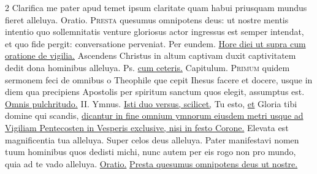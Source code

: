 \begin{multicols*}{2}
 Clarifica me pater apud temet ipsum claritate quam habui priusquam mundus fieret alleluya. {\color{Red} Oratio.}
\lettrine[lines=2]{\zallmancaps \color{Blue} P}{resta} \hypertarget{presta-quesumus-ascensionis}{\label{presta-quesumus-ascensionis}} quesumus omnipotens deus: ut nostre mentis intentio quo sollemnitatis venture gloriosus actor ingressus est semper intendat, et quo fide pergit: conversatione perveniat. Per eundem. \ul{Hore diei ut supra cum oratione de vigilia.}
 Ascendens Christus in altum captivam duxit captivitatem dedit dona hominibus alleluya. {\color{Red} Ps.}  \ul{cum ceteris.} {\color{Red} Capitulum.}
\lettrine[lines=2]{\zallmancaps \color{Red} P}{rimum} \hypertarget{primum-quidem-capitulum}{\label{primum-quidem-capitulum}} quidem sermonem feci de omnibus o Theophile que cepit Ihesus facere et docere, usque in diem qua precipiens Apostolis per spiritum sanctum quos elegit, assumptus est. \R \hyperlink{omnis-pulchritudo}{Omnis pulchritudo.} {\color{Red} II. Ymnus.}
\newline \ul{Isti duo versus, scilicet,} Tu esto, \ul{et} Gloria tibi domine qui scandis, \ul{dicantur in fine omnium ymnorum eiusdem metri usque ad Vigiliam Pentecosten in Vesperis exclusive, nisi in festo Corone.}
\newline \V Elevata est magnificentia tua alleluya. \V Super celos deus alleluya.
 Pater manifestavi nomen tuum hominibus quos dedisti michi, nunc autem per eis rogo non pro mundo, quia ad te vado alleluya. \ul{Oratio.} \hyperlink{presta-quesumus-ascensionis}{Presta quesumus omnipotens deus ut nostre.}

\end{multicols*}
